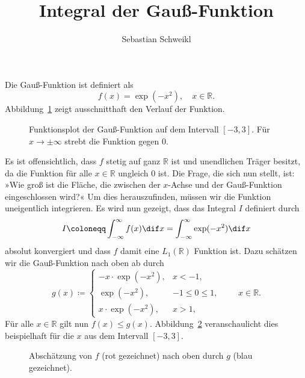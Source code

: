 \documentclass{scrartcl}
\newcommand{\R}{\mathbb{R}}
\begin{document}
\title{Integral der Gauß-Funktion}
\author{Sebastian Schweikl}


Die Gauß-Funktion ist definiert als
\[
  f(x) = \exp(-x^{2}), \quad x \in \mathbb{R}.
\]
Abbildung~\ref{fig:gaussian} zeigt ausschnitthaft den Verlauf der Funktion.
\begin{figure}[ht]
  \centering
  \caption{Funktionsplot der Gauß-Funktion auf dem Intervall $ [-3, 3] $. 
    Für $ x \rightarrow \pm \infty $ strebt die Funktion gegen $ 0 $.}
  \label{fig:gaussian}
\end{figure}
Es ist offensichtlich, dass $ f $ stetig auf ganz $ \R $ ist und unendlichen Träger besitzt, da die 
Funktion für alle $ x \in \R $ ungleich $ 0 $ ist. Die Frage, die sich nun stellt, ist: »Wie groß 
ist die Fläche, die zwischen der $ x $-Achse und der Gauß-Funktion eingeschlossen wird?« Um dies 
herauszufinden, müssen wir die Funktion uneigentlich integrieren. Es wird nun gezeigt, dass das 
Integral $ I $ definiert durch
\[
  I \coloneqq \int_{- \infty}^{\infty} f(x) \dif x = \int_{- \infty}^{\infty} \exp(-x^{2}) \dif x
\]
absolut konvergiert und dass $ f $ damit eine $ L_{1}(\R) $ Funktion ist. Dazu schätzen wir die 
Gauß-Funktion nach oben ab durch
\[
  g(x) \coloneqq \begin{cases}
    -x \cdot \exp(-x^{2}), & x < -1, \\
    \exp(-x^{2}),          & -1 \leq 0 \leq 1, \\
    x \cdot \exp(-x^{2}),  & x > 1,
  \end{cases}
  \qquad x \in \R.
\]
Für alle $ x \in \R $ gilt nun $ f(x) \leq g(x) $. Abbildung~\ref{fig:approximation} 
veranschaulicht dies beispielhaft für die $ x $ aus dem Intervall $ [-3,3] $.
\begin{figure}[ht]
  \centering
  \caption{Abschätzung von $ f $ (rot gezeichnet) nach oben durch $ g $ (blau gezeichnet).}
  \label{fig:approximation}
\end{figure}
\end{document}
